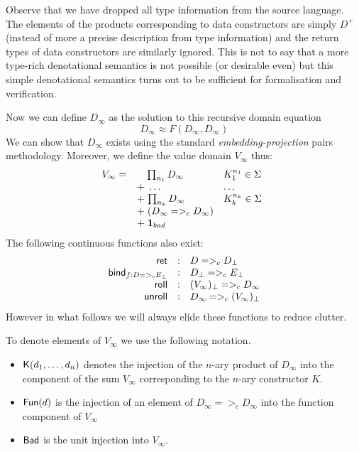 Observe that we have dropped all type information from the source
language. The elements of the products corresponding to data
constructors are simply $D^{+}$ (instead of more a precise description
from type information) and the return types of data constructors are
similarly ignored. This is not to say that a more type-rich
denotational semantics is not possible (or desirable even) but this
simple denotational semantics turns out to be sufficient for
formalisation and verification.


Now we can define $D_{\infty}$ as the solution to this recursive domain equation
$$D_{\infty} \approx F( D_{\infty}, D_{\infty})$$
We can show that $D_{\infty}$ exists using the
standard {\em embedding-projection} pairs methodology. Moreover, we define the
value domain $V_{\infty}$ thus:
    \[V_{\infty} = \begin{array}[t]{ll}
             \quad\;{\prod_{n_1}{D_{\infty}}} & K_1^{n_1} \in \Sigma \\
             \; + \;\ldots                    & \ldots \\
             \; + \;{\prod_{n_k}{D_{\infty}}} & K_k^{n_k} \in \Sigma \\
             \; + \;(D_{\infty} =>_c D_{\infty}) \\
             \; + \;{\sf{\bf 1}}_{bad} \quad
    \end{array}\]
The following continuous functions also exist:
\[\begin{array}{rcl}
  \mathsf{ret}   & : & D =>_c D_\bot \\
  \mathsf{bind}_{f : D =>_c E_\bot} & : & D_\bot =>_c E_\bot \\
  \mathsf{roll} & : & (V_{\infty})_\bot =>_c D_{\infty} \\
  \mathsf{unroll} & : &D_{\infty} =>_c (V_{\infty})_\bot
\end{array}\]
However in what follows we will always elide these functions to reduce clutter.

To denote elements of $V_{\infty}$ we use the following notation.
\begin{itemize}
\item $\mathsf{K}(d_1, \ldots, d_n)$ denotes the injection of
the $n$-ary product of $D_{\infty}$ into the component of the sum
$V_{\infty}$ corresponding to the $n$-ary constructor $K$.
\item $\mathsf{Fun}(d)$ is the injection of
an element of $D_{\infty} =>_c D_{\infty}$ into the function component of $V_{\infty}$
\item $\mathsf{Bad}$ is the unit injection into $V_{\infty}$.
\end{itemize}

